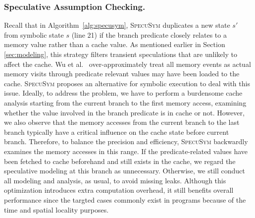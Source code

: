 \documentclass[sigconf]{acmart}
\newcommand\ignore[1]{}
\newcommand{\SpecuSym}{\textsc{SpecuSym} }
\begin{document}
\subsubsection{Speculative Assumption Checking.}
Recall that in Algorithm~\ref{alg:specusym}, \SpecuSym duplicates a new state 
$s'$ from symbolic state $s$ (line 21) if the branch predicate closely relates 
to a memory value rather than a cache value. As mentioned earlier in Section
\ref{sec:modeling}, this strategy filters transient speculations that are unlikely 
to affect the cache. Wu et al.~\cite{WuW19} over-approximately treat all memory 
events as actual memory visits through predicate relevant values may have been 
loaded to the cache. \SpecuSym proposes an alternative for symbolic execution to 
deal with this issue. Ideally, to address the problem, we have to perform a 
burdensome cache analysis starting from the current branch to the first memory 
access, examining whether the value involved in the branch predicate is in cache 
or not. However, we also observe that the memory accesses from the current branch 
to the last branch typically have a critical influence on the cache state before 
current branch. Therefore, to balance the precision and efficiency, \SpecuSym 
backwardly examines the memory accesses in this range. If the predicate-related 
values have been fetched to cache beforehand and still exists in the cache, we 
regard the speculative modeling at this branch as unnecessary. Otherwise, we still 
conduct all modeling and analysis, as usual, to avoid missing leaks. Although this 
optimization introduces extra computation overhead, it still benefits overall 
performance since the targted cases commonly exist in programs because of the time 
and spatial locality purposes.


\ignore{
Besides, we also record 
instructions whose memory access has manifested leakage so that 
following analysis can directly skip these instructions and carries on. 
}

\ignore{
\textbf{Bound mis-prediction rate.}
Modern processor typically has a mis-prediction rate lower than 90\% 
\cite{} which means it's very uncommon that all prediction results are 
wrong. Therefore, we set up a bound of mis-prediction rate by selecting 
at most 10\% out of all speculative state trace for analysis. Only memory 
access in these traces will be considered while the others are ignored. 
Furthermore, instead of enumerating all combinations of selected traces, 
we only analyze part of them without losing accuracy according to following 
observation: using LRU policy, the nearer a memory access is, the more impact 
it has on cache state. Thus, we only analyze combinations of speculative 
state traces that share no common suffixes.
}
\end{document}
